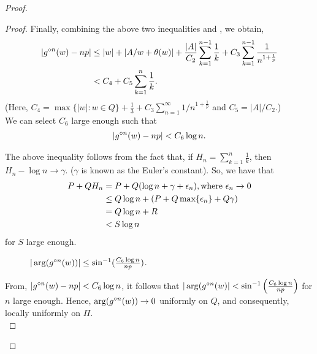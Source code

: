 \begin{proof}
\begin{proof}
Finally, combining the above two inequalities and , we obtain,
\begin{align*}
	|\gog[n](w)-np|&\le |w|+|A /w+\theta (w)|+\frac{|A|}{C_2}\sum_{k=1}^{n-1} \frac{1}{k}+C_3\sum_{k=1}^{n-1} \frac{1}{n^{1+\frac{1}{p}}}\\
				   &< C_4+C_5\sum_{k=1}^{n} \frac{1}{k}
.\end{align*}
(Here, \( C_4=\max\{|w|:w\in Q\}+\frac{1}{3}+C_3\sum_{n=1}^{\infty}  1 /n^{1+\frac{1}{p}} \) and \( C_5=|A| /C_2\).)\\
We can select \( C_6 \) large enough such that
\begin{align}
	|\gog[n](w)-np|<C_6 \log n \label{eqn3.7}
.\end{align}

\begin{remark}
	The above inequality follows from the fact that, if \( H_n=\sum_{k=1}^n \frac{1}{k} \), then \( H_n-\log n\to \gamma \).
	(\( \gamma \) is known as the Euler's constant).
	So, we have that
	\begin{align*}
		P+QH_n &=P+Q(\log n+\gamma +\epsilon_n), \text{where \( \epsilon_n\to 0 \)}\\
			   &\le Q\log n+(P+Q\max\{\epsilon_n\}+Q\gamma)\\
			   &=Q\log n+R\\
			   &<S \log n
	\end{align*} for \( S \) large enough.
\end{remark}

\begin{figure}[ht]
    \centering
	\caption{$|\arg(\gog[n](w))|\le \sin^{-1}(\frac{C_6 \log n}{np})$.}
    \label{argogn}
\end{figure}
From, \( |\gog[n](w)-np|<C_6\log n \), it follows that \( |\arg(\gog[n](w)|<\sin ^{-1}\left(\frac{C_6\log n}{np}\right) \)
for \( n \) large enough. Hence, \( \arg(\gog[n](w))\to 0 \) uniformly on \( Q \), and consequently, locally uniformly on \( \Pi \).\\
\vspace{1pt}


\end{proof}
\end{proof}
